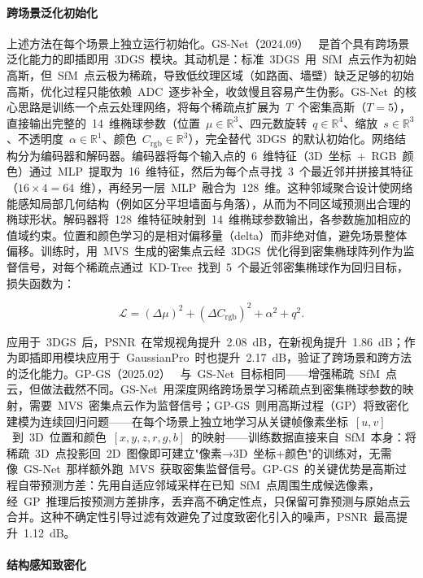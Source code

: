\paragraph{跨场景泛化初始化}

上述方法在每个场景上独立运行初始化。GS-Net（2024.09）~\cite{2409_11307} 是首个具有跨场景泛化能力的即插即用~3DGS~模块。其动机是：标准~3DGS~用~SfM~点云作为初始高斯，但~SfM~点云极为稀疏，导致低纹理区域（如路面、墙壁）缺乏足够的初始高斯，优化过程只能依赖~ADC~逐步补全，收敛慢且容易产生伪影。GS-Net~的核心思路是训练一个点云处理网络，将每个稀疏点扩展为~$T$~个密集高斯（$T=5$），直接输出完整的~14~维椭球参数（位置~$\mu \in \mathbb{R}^{3}$、四元数旋转~$q \in \mathbb{R}^{4}$、缩放~$s \in \mathbb{R}^{3}$、不透明度~$\alpha \in \mathbb{R}^{1}$、颜色~$C_{\text{rgb}} \in \mathbb{R}^{3}$），完全替代~3DGS~的默认初始化。网络结构分为编码器和解码器。编码器将每个输入点的~6~维特征（3D~坐标~+~RGB~颜色）通过~MLP~提取为~16~维特征，然后为每个点寻找~3~个最近邻并拼接其特征（$16 \times 4 = 64$~维），再经另一层~MLP~融合为~128~维。这种邻域聚合设计使网络能感知局部几何结构（例如区分平坦墙面与角落），从而为不同区域预测出合理的椭球形状。解码器将~128~维特征映射到~14~维椭球参数输出，各参数施加相应的值域约束。位置和颜色学习的是相对偏移量（delta）而非绝对值，避免场景整体偏移。训练时，用~MVS~生成的密集点云经~3DGS~优化得到密集椭球阵列作为监督信号，对每个稀疏点通过~KD-Tree~找到~5~个最近邻密集椭球作为回归目标，损失函数为：

\begin{equation*}
\mathcal{L} = (\Delta\mu)^2 + (\Delta C_{\text{rgb}})^2 + \alpha^2 + q^2.
\end{equation*}

应用于~3DGS~后，PSNR~在常规视角提升~2.08~dB，在新视角提升~1.86~dB；作为即插即用模块应用于~GaussianPro~时也提升~2.17~dB，验证了跨场景和跨方法的泛化能力。GP-GS（2025.02）~\cite{2502_02283} 与~GS-Net~目标相同——增强稀疏~SfM~点云，但做法截然不同。GS-Net~用深度网络跨场景学习稀疏点到密集椭球参数的映射，需要~MVS~密集点云作为监督信号；GP-GS~则用高斯过程（GP）将致密化建模为连续回归问题——在每个场景上独立地学习从关键帧像素坐标~$[u,v]$~到~3D~位置和颜色~$[x,y,z,r,g,b]$~的映射——训练数据直接来自~SfM~本身：将稀疏~3D~点投影回~2D~图像即可建立"像素→3D~坐标+颜色"的训练对，无需像~GS-Net~那样额外跑~MVS~获取密集监督信号。GP-GS~的关键优势是高斯过程自带预测方差：先用自适应邻域采样在已知~SfM~点周围生成候选像素，经~GP~推理后按预测方差排序，丢弃高不确定性点，只保留可靠预测与原始点云合并。这种不确定性引导过滤有效避免了过度致密化引入的噪声，PSNR~最高提升~1.12~dB。

\paragraph{结构感知致密化}

